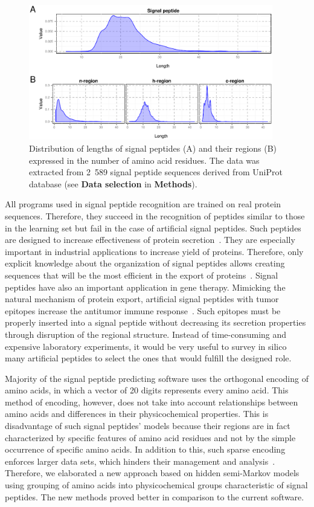 \documentclass[fleqn,10pt,twoside]{gcb15submission}
\begin{document}
\begin{figure}[ht]\centering
\includegraphics[width=0.95\textwidth]{figures/reglen.eps}
\caption{Distribution of lengths of signal peptides (A) and their regions (B) expressed in the number of amino acid residues. The data was extracted from 2~589 signal peptide sequences derived from UniProt database (see \textbf{Data selection} in \textbf{Methods}).}
\label{fig:reglen}
\end{figure}

All programs used in signal peptide recognition are trained on real protein sequences. Therefore, they succeed in the recognition of peptides similar to those in the learning set but fail in the case of artificial signal peptides. Such peptides are designed to increase effectiveness of protein secretion~\citep{2010futatsumorisugaisignal}. They are especially important in industrial applications to increase yield of proteins. Therefore, only explicit knowledge about the organization of signal peptides allows creating sequences that will be the most efficient in the export of proteins~\citep{2013ngengineering}. Signal peptides have also an important application in gene therapy. Mimicking the natural mechanism of protein export, artificial signal peptides with tumor epitopes increase the antitumor immune response~\citep{2003heenhanced}. Such epitopes must be properly inserted into a signal peptide without decreasing its secretion properties through disruption of the regional structure. Instead of time-consuming and expensive laboratory experiments, it would be very useful to survey in silico many artificial peptides to select the ones that would fulfill the designed role.

Majority of the signal peptide predicting software uses the orthogonal encoding of amino acids, in which a vector of 20 digits represents every amino acid. This method of encoding, however, does not take into account relationships between amino acids and differences in their physicochemical properties. This is disadvantage of such signal peptides' models because their regions are in fact characterized by specific features of amino acid residues and not by the simple occurrence of specific amino acids. In addition to this, such sparse encoding enforces larger data sets, which hinders their management and analysis~\citep{2002linamino}. Therefore, we elaborated a new approach based on hidden semi-Markov models using grouping of amino acids into physicochemical groups characteristic of signal peptides. The new methods proved better in comparison to the current software.
\end{document}
